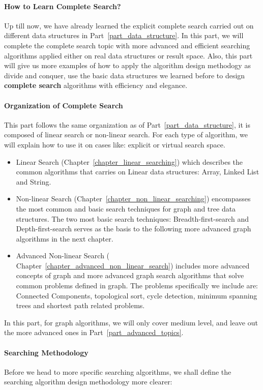 \documentclass[../main.tex]{subfiles}
\begin{document}
\paragraph{How to Learn Complete Search?} Up till now, we have already learned the explicit complete search carried out on different data structures in Part~\ref{part_data_structure}. In this part, we will complete the complete search topic with more advanced and efficient searching algorithms applied either on real data structures or result space. Also, this part will give us more examples of how to apply the algorithm design methodogy as divide and conquer, use the basic data structures we learned before to design \textbf{complete search} algorithms with efficiency and elegance. 

\paragraph{Organization of Complete Search} This part follows the same organization as of  Part~\ref{part_data_structure},  it is composed of linear search or non-linear search. For each type of algorithm, we will explain how to use it on cases like: explicit or virtual search space. 

\begin{itemize}
    \item Linear Search (Chapter~\ref{chapter_linear_searching}) which describes the common algorithms that carries on Linear data structures: Array, Linked List and String. 
    \item Non-linear Search (Chapter~\ref{chapter_non_linear_searching}) encompasses the most common and basic search techniques for graph and tree data structures. The two most basic search techniques: Breadth-first-search and Depth-first-search serves as the basis to the following more advanced graph algorithms in the next chapter.
    \item Advanced Non-linear Search ( Chapter~\ref{chapter_advanced_non_linear_search}) includes more advanced concepts of graph and more advanced graph search algorithms that solve common problems defined in graph. The problems specifically we include are: Connected Components, topological sort, cycle detection, minimum spanning trees and shortest path related problems. 
\end{itemize}

In this part, for graph algorithms, we will only cover medium level, and leave out the more advanced ones in Part~\ref{part_advanced_topics}.

\paragraph{Searching Methodology}
Before we head to more specific searching algorithms, we shall define the searching algorithm design methodology more clearer:
\end{document}
